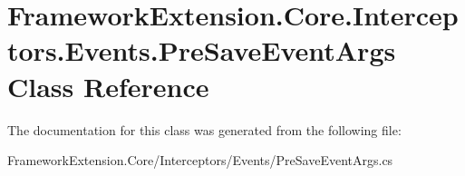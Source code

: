 \hypertarget{class_framework_extension_1_1_core_1_1_interceptors_1_1_events_1_1_pre_save_event_args}{\section{Framework\-Extension.\-Core.\-Interceptors.\-Events.\-Pre\-Save\-Event\-Args Class Reference}
\label{class_framework_extension_1_1_core_1_1_interceptors_1_1_events_1_1_pre_save_event_args}
}


The documentation for this class was generated from the following file\-:\begin{DoxyCompactItemize}
\item 
Framework\-Extension.\-Core/\-Interceptors/\-Events/Pre\-Save\-Event\-Args.\-cs\end{DoxyCompactItemize}
